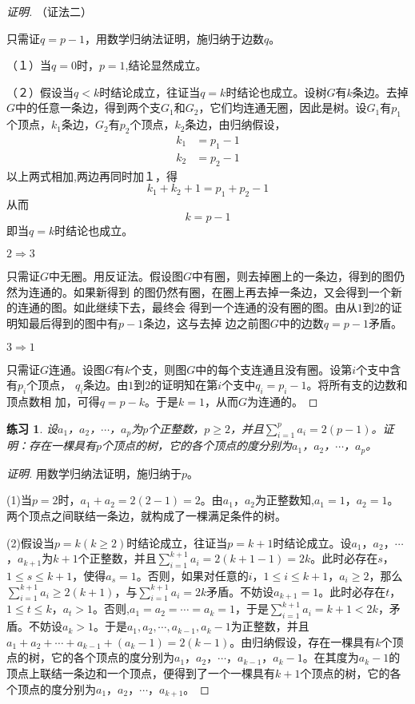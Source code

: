 \documentclass{book}[oneside]
\newtheorem{Exercise}{练习}
\begin{document}
\begin{CJK*}{UTF8}{gbsn}
\begin{proof}[证明]
    （证法二）
    
    只需证$q=p-1$，用数学归纳法证明，施归纳于边数$q$。
    
    （１）当$q=0$时，$p=1$,结论显然成立。

    （２）假设当$q<k$时结论成立，往证当$q=k$时结论也成立。设树$G$有$k$条边。去掉$G$中的任意一条边，得到两个支$G_1$和$G_2$，它们均连通无圈，因此是树。设$G_1$有$p_1$个顶点，$k_1$条边，$G_2$有$p_2$个顶点，$k_2$条边，由归纳假设，
    \begin{equation*}
      \begin{split}
        k_1 &= p_1 - 1\\
        k_2 &= p_2 - 1
      \end{split}
    \end{equation*}
    以上两式相加,两边再同时加１，得
    \[k_1 + k_2  + 1 = p_1 + p_2 - 1\]
    从而
    \[k = p - 1 \]
    即当$q=k$时结论也成立。



    $2\Rightarrow3$

只需证$G$中无圈。用反证法。假设图$G$中有圈，则去掉圈上的一条边，得到的图仍然为连通的。如果新得到
的图仍然有圈，在圈上再去掉一条边，又会得到一个新的连通的图。如此继续下去，最终会
得到一个连通的没有圈的图。由从$1$到$2$的证明知最后得到的图中有$p-1$条边，这与去掉
边之前图$G$中的边数$q=p-1$矛盾。


 $3\Rightarrow1$

 只需证$G$连通。设图$G$有$k$个支，则图$G$中的每个支连通且没有圈。设第$i$个支中含有$p_i$个顶点，
$q_i$条边。由$1$到$2$的证明知在第$i$个支中$q_i=p_i-1$。将所有支的边数和顶点数相
加，可得$q = p-k$。于是$k=1$，从而$G$为连通的。
\end{proof}

\begin{Exercise}
  设$a_1$，$a_2$，$\cdots$，$a_p$为$p$个正整数，$p\geq 2$，并且$\sum_{i=1}^pa_i=2(p-1)$。证明：存在一棵具有$p$个顶点的树，它的各个顶点的度分别为$a_1$，$a_2$，$\cdots$，$a_p$。
\end{Exercise}
\begin{proof}[证明]  用数学归纳法证明，施归纳于$p$。

  (1)当$p=2$时，$a_1+a_2=2(2-1)=2$。由$a_1$，$a_2$为正整数知,$a_1=1$，$a_2=1$。两个顶点之间联结一条边，就构成了一棵满足条件的树。

  (2)假设当$p=k(k\geq 2)$时结论成立，往证当$p=k+1$时结论成立。设$a_1$，$a_2$，$\cdots$，$a_{k+1}$为$k+1$个正整数，并且$\sum_{i=1}^{k+1}a_i=2(k+1-1)=2k$。此时必存在$s$，$1\leq s \leq k+1$，使得$a_s=1$。否则，如果对任意的$i$，$1\leq i \leq k+1$，$a_i\geq 2$，那么$\sum_{i=1}^{k+1}a_i\geq 2(k+1)$，与$\sum_{i=1}^{k+1}a_i=2k$矛盾。不妨设$a_{k+1}=1$。此时必存在$t$，$1\leq t \leq k$，$a_t>1$。否则,$a_1=a_2=\cdots=a_k=1$，于是$\sum_{i=1}^{k+1}a_i=k+1<2k$，矛盾。不妨设$a_k>1$。于是$a_1,a_2,\cdots,a_{k-1},a_{k}-1$为正整数，并且$a_1 + a_2 + \cdots + a_{k-1} + (a_{k}-1) = 2(k-1)$。由归纳假设，存在一棵具有$k$个顶点的树，它的各个顶点的度分别为$a_1$，$a_2$，$\cdots$，$a_{k-1}$，$a_k-1$。在其度为$a_k-1$的顶点上联结一条边和一个顶点，便得到了一个一棵具有$k+1$个顶点的树，它的各个顶点的度分别为$a_1$，$a_2$，$\cdots$，$a_{k+1}$。
\end{proof}


\end{CJK*}
\end{document}
